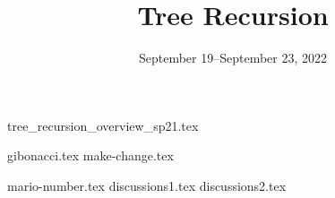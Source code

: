 \documentclass{exam}
\title{Tree Recursion}
\date{September 19--September 23, 2022}
\begin{document}
\maketitle

{tree_recursion_overview_sp21.tex}

\begin{questions}
{gibonacci.tex}
{make-change.tex}

{mario-number.tex}
\pagebreak
{discussions1.tex}
\pagebreak
{discussions2.tex}

\end{questions}
\end{document}
